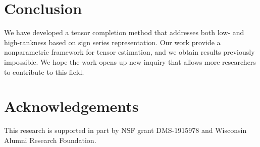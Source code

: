 \documentclass[11pt]{article}
\theoremstyle{plain}
\theoremstyle{definition}
\begin{document}
\section{Conclusion}
We have developed a tensor completion method that addresses both low- and high-rankness based on sign series representation. Our work provide a nonparametric framework for tensor estimation, and we obtain results  previously impossible.  We hope the work opens up new inquiry that allows more researchers to contribute to this field.

\section*{Acknowledgements}
This research is supported in part by NSF grant DMS-1915978 and Wisconsin Alumni Research Foundation.




\end{document}
